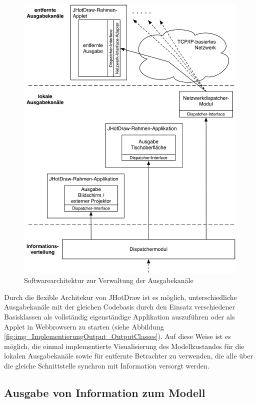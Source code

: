 \begin{figure}[htbp]
	\centering
		\includegraphics[width=15cm]{img/ImplementierungOutput/OutputArchitecture.png}
	\caption{Softwarearchitektur zur Verwaltung der Ausgabekanäle}
	\label{fig:img_ImplementierungOutput_OutputArchitecture}
\end{figure}

Durch die flexible Architekur von JHotDraw ist es möglich, unterschiedliche Ausgabekanäle mit der gleichen Codebasis durch den Einsatz verschiedener Basisklassen als vollständig eigenständige Applikation auszuführen oder als Applet in Webbrowsern zu starten (siehe Abbildung \ref{fig:img_ImplementierungOutput_OutputClasses}). Auf diese Weise ist es möglich, die einmal implementierte Visualisierung des Modellzustandes für die lokalen Ausgabekanäle sowie für entfernte Betrachter zu verwenden, die alle über die gleiche Schnittstelle synchron mit Information versorgt werden.


\subsection{Ausgabe von Information zum Modell} %
\label{sub:ausgabe_von_information_zum_modell}

